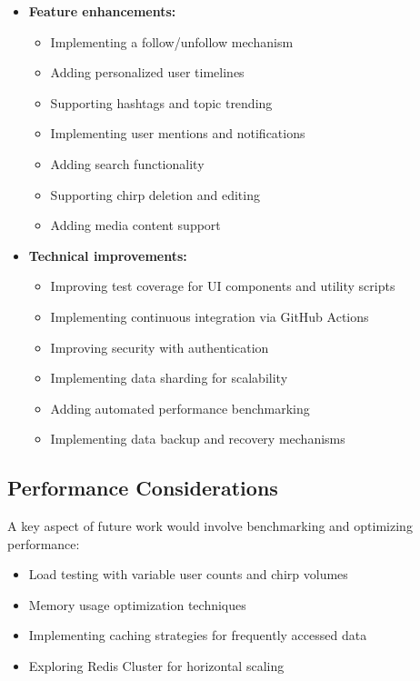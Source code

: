 \documentclass[a4paper,11pt]{article}
\begin{document}
\begin{itemize}
    \item \textbf{Feature enhancements:}
    \begin{itemize}
        \item Implementing a follow/unfollow mechanism
        \item Adding personalized user timelines
        \item Supporting hashtags and topic trending
        \item Implementing user mentions and notifications
        \item Adding search functionality
        \item Supporting chirp deletion and editing
        \item Adding media content support
    \end{itemize}
    
    \item \textbf{Technical improvements:}
    \begin{itemize}
        \item Improving test coverage for UI components and utility scripts
        \item Implementing continuous integration via GitHub Actions
        \item Improving security with authentication
        \item Implementing data sharding for scalability
        \item Adding automated performance benchmarking
        \item Implementing data backup and recovery mechanisms
    \end{itemize}
\end{itemize}

\subsection{Performance Considerations}
A key aspect of future work would involve benchmarking and optimizing performance:

\begin{itemize}
    \item Load testing with variable user counts and chirp volumes
    \item Memory usage optimization techniques
    \item Implementing caching strategies for frequently accessed data
    \item Exploring Redis Cluster for horizontal scaling
\end{itemize}
\end{document}
